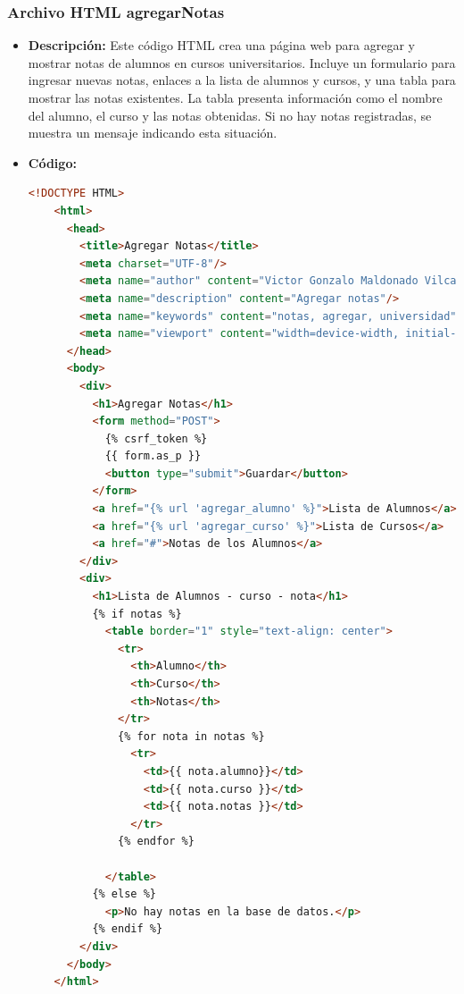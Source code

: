 \documentclass{article}
\begin{document}

  \subsubsection{Archivo HTML agregarNotas}
  \begin{itemize}
    \item \textbf{Descripción: }Este código HTML crea una página web para agregar y mostrar notas de alumnos en cursos universitarios. 
    Incluye un formulario para ingresar nuevas notas, enlaces a la lista de alumnos y cursos, y una tabla para mostrar las notas 
    existentes. La tabla presenta información como el nombre del alumno, el curso y las notas obtenidas. Si no hay notas 
    registradas, se muestra un mensaje indicando esta situación.
    \item \textbf{Código: }
    \begin{lstlisting}[language=html, caption={HTML agregarNotas}]
    <!DOCTYPE HTML>
    <html>
      <head>
        <title>Agregar Notas</title>
        <meta charset="UTF-8"/>
        <meta name="author" content="Victor Gonzalo Maldonado Vilca"/>
        <meta name="description" content="Agregar notas"/>
        <meta name="keywords" content="notas, agregar, universidad"/>
        <meta name="viewport" content="width=device-width, initial-scale=1.0"/>
      </head>
      <body>
        <div>
          <h1>Agregar Notas</h1>
          <form method="POST">
            {% csrf_token %}
            {{ form.as_p }}
            <button type="submit">Guardar</button>
          </form>
          <a href="{% url 'agregar_alumno' %}">Lista de Alumnos</a>
          <a href="{% url 'agregar_curso' %}">Lista de Cursos</a>
          <a href="#">Notas de los Alumnos</a>
        </div>
        <div>
          <h1>Lista de Alumnos - curso - nota</h1>
          {% if notas %}
            <table border="1" style="text-align: center">
              <tr>
                <th>Alumno</th>
                <th>Curso</th>
                <th>Notas</th>
              </tr>
              {% for nota in notas %}
                <tr>
                  <td>{{ nota.alumno}}</td>
                  <td>{{ nota.curso }}</td>
                  <td>{{ nota.notas }}</td>
                </tr>
              {% endfor %}
            
            </table>
          {% else %}
            <p>No hay notas en la base de datos.</p>
          {% endif %}
        </div>
      </body>
    </html>
    \end{lstlisting}
   
  \end{itemize}
  
\end{document}
